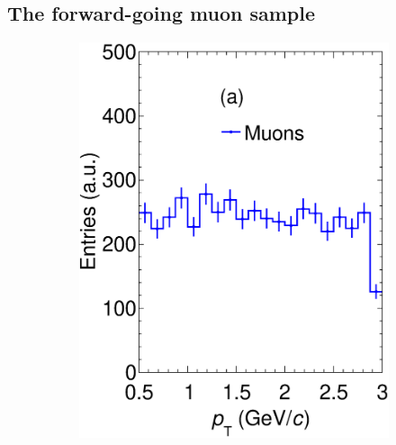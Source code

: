 \subsection{The forward-going muon sample}
\label{Sec:ForwardMuon}
\begin{figure}[t]
     \centering
     \begin{subfigure}[b]{0.32\textwidth}
         \centering
         \includegraphics[width=\textwidth]{figures/ch5-KF_NDGAr/FullSample/PGun/Props/pTAllTallpgun.eps}
         \caption{}
         \label{fig:ptTPC_PGun}
     \end{subfigure}
     \begin{subfigure}[b]{0.32\textwidth}
         \centering

\end{subfigure}
\end{figure}

